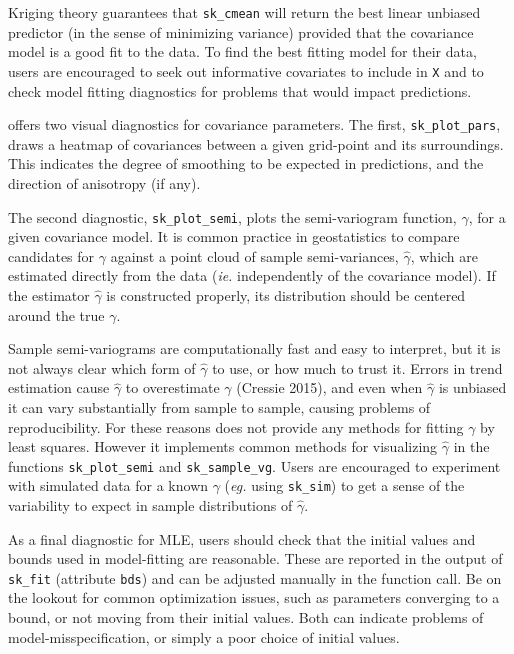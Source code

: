 Kriging theory guarantees that \texttt{sk\_cmean} will return the best linear unbiased predictor (in the sense of minimizing variance) provided that the covariance model is a good fit to the data. To find the best fitting model for their data, users are encouraged to seek out informative covariates to include in \texttt{X} and to check model fitting diagnostics for problems that would impact predictions.

 offers two visual diagnostics for covariance parameters. The first, \texttt{sk\_plot\_pars}, draws a heatmap of covariances between a given grid-point and its surroundings. This indicates the degree of smoothing to be expected in predictions, and the direction of anisotropy (if any).

The second diagnostic, \texttt{sk\_plot\_semi}, plots the semi-variogram function, \({\gamma}\), for a given covariance model. It is common practice in geostatistics to compare candidates for \({\gamma}\) against a point cloud of sample semi-variances, \(\hat{\gamma}\), which are estimated directly from the data (\emph{ie.} independently of the covariance model). If the estimator \(\hat{\gamma}\) is constructed properly, its distribution should be centered around the true \(\gamma\).

Sample semi-variograms are computationally fast and easy to interpret, but it is not always clear which form of \(\hat{\gamma}\) to use, or how much to trust it. Errors in trend estimation cause \(\hat{\gamma}\) to overestimate \(\gamma\) (Cressie 2015), and even when \(\hat{\gamma}\) is unbiased it can vary substantially from sample to sample, causing problems of reproducibility. For these reasons  does not provide any methods for fitting \({\gamma}\) by least squares. However it implements common methods for visualizing \(\hat{\gamma}\) in the functions \texttt{sk\_plot\_semi} and \texttt{sk\_sample\_vg}. Users are encouraged to experiment with simulated data for a known \(\gamma\) (\emph{eg.} using \texttt{sk\_sim}) to get a sense of the variability to expect in sample distributions of \(\hat{\gamma}\).

As a final diagnostic for MLE, users should check that the initial values and bounds used in model-fitting are reasonable. These are reported in the output of \texttt{sk\_fit} (attribute \texttt{\textquotesingle{}bds\textquotesingle{}}) and can be adjusted manually in the function call. Be on the lookout for common optimization issues, such as parameters converging to a bound, or not moving from their initial values. Both can indicate problems of model-misspecification, or simply a poor choice of initial values.

